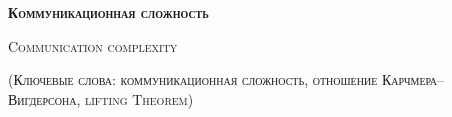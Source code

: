 


\thispagestyle{empty}


\centerline{\large \textsc{\textbf{Коммуникационная сложность}}}
\centerline{\textsc{Communication complexity}}
\centerline{\small \textsc{(Ключевые слова: коммуникационная сложность, отношение Карчмера--Вигдерсона,
        lifting Theorem)}}

\bigskip



\vspace{1cm}

%    

\nocite{*}
%
%
\printbibliography



